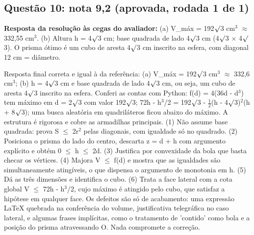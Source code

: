 \documentclass{article}%
\begin{document}
\subsection*{Questão 10: nota 9,2 (aprovada, rodada 1 de 1)}%
\textbf{Resposta da resolução às cegas do avaliador:} (a) V\_máx = 192$\surd$3 cm$^3$ $\approx$ 332,55 cm$^3$.\newline%
(b) Altura h = 4$\surd$3 cm; base quadrada de lado 4$\surd$3 cm (4$\surd$3 $\times$ 4$\surd$3). O prisma ótimo é um cubo de aresta 4$\surd$3 cm inscrito na esfera, com diagonal 12 cm = diâmetro.\par %
Resposta final correta e igual à da referência: (a) V\_máx = 192$\surd$3 cm$^3$ $\approx$ 332,6 cm$^3$; (b) h = 4$\surd$3 cm e base quadrada de lado 4$\surd$3 cm, ou seja, um cubo de aresta 4$\surd$3 inscrito na esfera. Conferi as contas com Python: f(d) = 4(36d - d$^3$) tem máximo em d = 2$\surd$3 com valor 192$\surd$3; 72h - h$^3$/2 = 192$\surd$3 - $\frac12$(h - 4$\surd$3)$^2$(h + 8$\surd$3); uma busca aleatória em quadriláteros ficou abaixo do máximo. A estrutura é rigorosa e cobre as armadilhas principais. (1) Não assume base quadrada: prova S $\leq$ 2r$^2$ pelas diagonais, com igualdade só no quadrado. (2) Posiciona o prisma do lado do centro, descarta z = d + h com argumento explícito e obtém 0 $\leq$ h $\leq$ 2d. (3) Justifica por convexidade da bola que basta checar os vértices. (4) Majora V $\leq$ f(d) e mostra que as igualdades são simultaneamente atingíveis, o que dispensa o argumento de monotonia em h. (5) Dá as três dimensões e identifica o cubo. (6) Trata a face lateral com a cota global V $\leq$ 72h - h$^3$/2, cujo máximo é atingido pelo cubo, que satisfaz a hipótese em qualquer face. Os defeitos são só de acabamento: uma expressão LaTeX quebrada na conferência do volume, justificativa telegráfica no caso lateral, e algumas frases implícitas, como o tratamento de 'contido' como bola e a posição do prisma atravessando O. Nada compromete a correção.%
\end{document}

